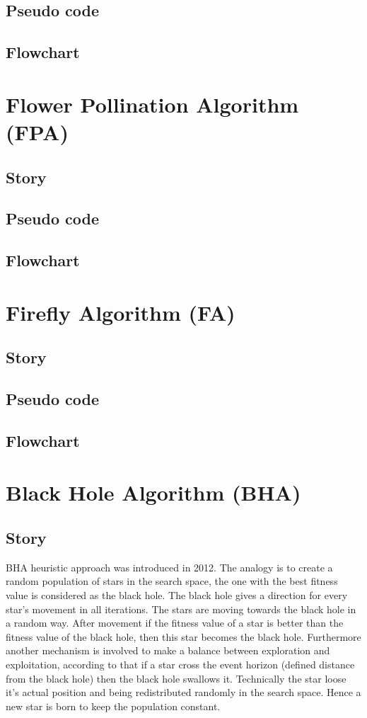 \documentclass[border=0.2cm]{report}
\begin{document}
\section{Pseudo code}
\section{Flowchart}

\chapter{Flower Pollination Algorithm (FPA)}
\section{Story}
\section{Pseudo code}
\section{Flowchart}

\chapter{Firefly Algorithm (FA)}
\section{Story}
\section{Pseudo code}
\section{Flowchart}

\chapter{Black Hole Algorithm (BHA)}
\section{Story}

BHA \cite{bha1, bha2} heuristic approach was introduced in 2012. The analogy is to create a random population of stars in the search space, the one with the best fitness value is considered as the black hole. The black hole gives a direction for every star's movement in all iterations. The stars are moving towards the black hole in a random way. After movement if the fitness value of a star is better than the fitness value of the black hole, then this star becomes the black hole. Furthermore another mechanism is involved to make a balance between exploration and exploitation, according to that if a star cross the event horizon (defined distance from the black hole) then the black hole swallows it. Technically the star loose it's actual position and being redistributed randomly in the search space. Hence a new star is born to keep the population constant. \\
\end{document}
